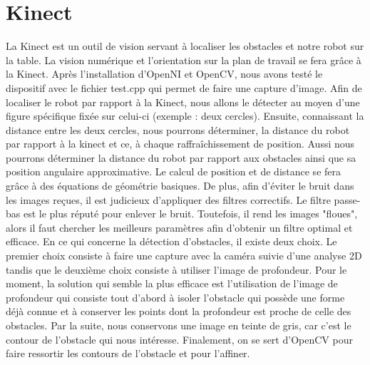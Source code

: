 \section{Kinect}
La Kinect est un outil de vision servant à localiser les obstacles et notre robot sur la table. La vision numérique et l'orientation sur la plan de travail se fera grâce à la Kinect. Après l’installation d’OpenNI et OpenCV, nous avons testé le dispositif avec le fichier test.cpp qui permet de faire une capture d’image. Afin de localiser le robot par rapport à la Kinect, nous allons le détecter au moyen d'une figure spécifique fixée sur celui-ci (exemple : deux cercles). Ensuite, connaissant la distance entre les deux cercles, nous pourrons déterminer, la distance du robot par rapport à la kinect et ce, à chaque raffraîchissement de position. Aussi nous pourrons déterminer la distance du robot par rapport aux obstacles ainsi que sa position angulaire approximative. Le calcul de position et de distance se fera grâce à des équations de géométrie basiques. De plus, afin d'éviter le bruit dans les images reçues, il est judicieux d'appliquer des filtres correctifs. Le filtre passe-bas est le plus réputé pour enlever le bruit. Toutefois, il rend les images "floues", alors il faut chercher les meilleurs paramètres afin d'obtenir un filtre optimal et efficace. En ce qui concerne la détection d’obstacles, il existe deux choix. Le premier choix consiste à faire une capture avec la caméra suivie d'une analyse 2D tandis que le deuxième choix consiste à utiliser l’image de profondeur. Pour le moment, la solution qui semble la plus efficace est l’utilisation de l’image de profondeur qui consiste tout d'abord à isoler l'obstacle qui possède une forme déjà connue et à conserver les points dont la profondeur est proche de celle des obstacles. Par la suite, nous conservons une image en teinte de gris, car c'est le contour de l'obstacle qui nous intéresse. Finalement, on se sert d'OpenCV pour faire ressortir les contours de l'obstacle et pour l'affiner. 
